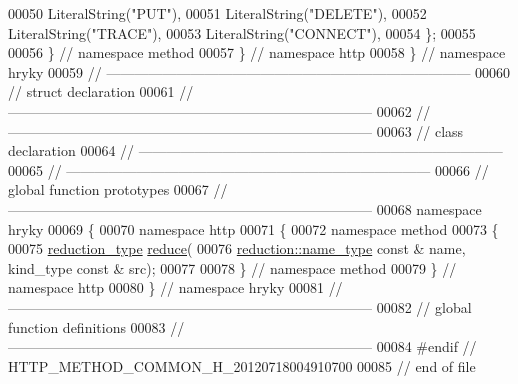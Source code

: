\begin{DoxyCode}
00050         LiteralString(\textcolor{stringliteral}{"PUT"}),
00051         LiteralString(\textcolor{stringliteral}{"DELETE"}),
00052         LiteralString(\textcolor{stringliteral}{"TRACE"}),
00053         LiteralString(\textcolor{stringliteral}{"CONNECT"}),
00054     \};
00055 
00056 \} \textcolor{comment}{// namespace method}
00057 \} \textcolor{comment}{// namespace http}
00058 \} \textcolor{comment}{// namespace hryky}
00059 \textcolor{comment}{//
      ------------------------------------------------------------------------------}
00060 \textcolor{comment}{// struct declaration}
00061 \textcolor{comment}{//
      ------------------------------------------------------------------------------}
00062 \textcolor{comment}{//
      ------------------------------------------------------------------------------}
00063 \textcolor{comment}{// class declaration}
00064 \textcolor{comment}{//
      ------------------------------------------------------------------------------}
00065 \textcolor{comment}{//
      ------------------------------------------------------------------------------}
00066 \textcolor{comment}{// global function prototypes}
00067 \textcolor{comment}{//
      ------------------------------------------------------------------------------}
00068 \textcolor{keyword}{namespace }hryky
00069 \{
00070 \textcolor{keyword}{namespace }http
00071 \{
00072 \textcolor{keyword}{namespace }method
00073 \{
00075     \hyperlink{namespacehryky_a343a9a4c36a586be5c2693156200eadc}{reduction_type} \hyperlink{namespacehryky_1_1http_a08fc36a78a8e2908140fcd102829a566}{reduce}(
00076         \hyperlink{namespacehryky_1_1reduction_ac686c30a4c8d196bbd0f05629a6b921f}{reduction::name_type} \textcolor{keyword}{const} & name, kind\_type \textcolor{keyword}{const} & src);
00077 
00078 \} \textcolor{comment}{// namespace method}
00079 \} \textcolor{comment}{// namespace http}
00080 \} \textcolor{comment}{// namespace hryky}
00081 \textcolor{comment}{//
      ------------------------------------------------------------------------------}
00082 \textcolor{comment}{// global function definitions}
00083 \textcolor{comment}{//
      ------------------------------------------------------------------------------}
00084 \textcolor{preprocessor}{#endif // HTTP\_METHOD\_COMMON\_H\_20120718004910700}
00085 \textcolor{preprocessor}{}\textcolor{comment}{// end of file}
\end{DoxyCode}
